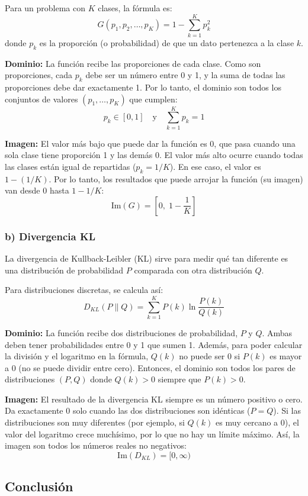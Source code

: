 \documentclass{article}
\begin{document}
Para un problema con $K$ clases, la fórmula es:
\[
    G(p_1, p_2, \ldots, p_K) = 1 - \sum_{k=1}^{K} p_k^2
\]
donde $p_k$ es la proporción (o probabilidad) de que un dato pertenezca a la clase $k$.

\textbf{Dominio:} La función recibe las proporciones de cada clase. Como son proporciones, cada $p_k$ debe ser un número entre 0 y 1, y la suma de todas las proporciones debe dar exactamente 1. Por lo tanto, el dominio son todos los conjuntos de valores $(p_1, \ldots, p_K)$ que cumplen:
\[
    p_k \in [0, 1] \quad \text{y} \quad \sum_{k=1}^{K} p_k = 1
\]

\textbf{Imagen:} El valor más bajo que puede dar la función es 0, que pasa cuando una sola clase tiene proporción 1 y las demás 0. El valor más alto ocurre cuando todas las clases están igual de repartidas ($p_k = 1/K$). En ese caso, el valor es $1 - (1/K)$. Por lo tanto, los resultados que puede arrojar la función (su imagen) van desde 0 hasta $1 - 1/K$:
\[
    \text{Im}(G) = \left[0, \; 1 - \frac{1}{K}\right]
\]

\subsubsection{b) Divergencia KL}

La divergencia de Kullback-Leibler (KL) sirve para medir qué tan diferente es una distribución de probabilidad $P$ comparada con otra distribución $Q$. 

Para distribuciones discretas, se calcula así:
\[
    D_{KL}(P \| Q) = \sum_{k=1}^{K} P(k) \ln \frac{P(k)}{Q(k)}
\]

\textbf{Dominio:} La función recibe dos distribuciones de probabilidad, $P$ y $Q$. Ambas deben tener probabilidades entre 0 y 1 que sumen 1. Además, para poder calcular la división y el logaritmo en la fórmula, $Q(k)$ no puede ser 0 si $P(k)$ es mayor a 0 (no se puede dividir entre cero). Entonces, el dominio son todos los pares de distribuciones $(P, Q)$ donde $Q(k) > 0$ siempre que $P(k) > 0$.

\textbf{Imagen:} El resultado de la divergencia KL siempre es un número positivo o cero. Da exactamente 0 solo cuando las dos distribuciones son idénticas ($P = Q$). Si las distribuciones son muy diferentes (por ejemplo, si $Q(k)$ es muy cercano a 0), el valor del logaritmo crece muchísimo, por lo que no hay un límite máximo. Así, la imagen son todos los números reales no negativos:
\[
    \text{Im}(D_{KL}) = [0, \infty)
\]

\subsection{Conclusión}
\end{document}
